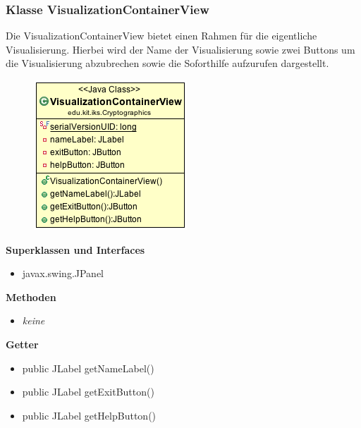 \documentclass{article}
\begin{document}
    \subsubsection{Klasse VisualizationContainerView}
      Die VisualizationContainerView bietet einen Rahmen für die eigentliche Visualisierung. Hierbei wird der Name der Visualisierung sowie zwei Buttons um die Visualisierung abzubrechen sowie die Soforthilfe aufzurufen dargestellt.
      \begin{figure}[H]
        \centering
        \includegraphics[width=\textwidth]{resources/edu-kit-iks-Cryptographics-VisualizationContainerView}
      \end{figure}

      \textbf{Superklassen und Interfaces}
      \begin{itemize}
        \item javax.swing.JPanel
      \end{itemize}
      
      \textbf{Methoden}
      \begin{itemize}
        \item \textit{keine}
      \end{itemize}

      \textbf{Getter}
      \begin{itemize}
        \item public JLabel getNameLabel()
        \item public JLabel getExitButton()
        \item public JLabel getHelpButton()
      \end{itemize}
\end{document}
